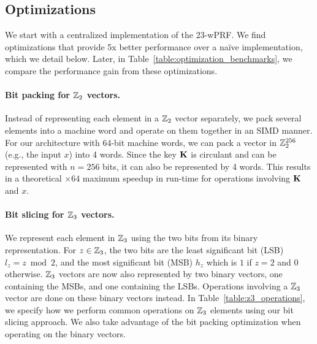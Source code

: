 \subsection{Optimizations}
\label{subsec:implementation_opt}
We start with a centralized implementation of the 23-wPRF. We find optimizations that provide 5x better performance over a na\"ive implementation, which we detail below. Later, in Table~\ref{table:optimization_benchmarks}, we compare the performance gain from these optimizations.

\paragraph{Bit packing for $\mathbb{Z}_2$ vectors.} 
Instead of representing each element in a $\mathbb{Z}_2$ vector separately, we pack several elements into a machine word and operate on them together in an SIMD manner. For our architecture with 64-bit machine words, we can pack a vector in $\mathbb{Z}_2^{256}$ (e.g., the input $x$) into 4 words. Since the key $\mat{K}$ is circulant and can be represented with $n=256$ bits, it can also be represented by 4 words. This results in a theoretical $\times64$ maximum speedup in run-time for operations involving $\mat{K}$ and $x$. 

\paragraph{Bit slicing for $\mathbb{Z}_3$ vectors.}
We represent each element in $\mathbb{Z}_3$ using the two bits from its binary representation. For $z \in \mathbb{Z}_3$, the two bits are the least significant bit (LSB) $l_z = z \bmod 2$, and the most significant bit (MSB) $h_z$ which is $1$ if $z=2$ and $0$ otherwise. $\mathbb{Z}_3$ vectors are now also represented by two binary vectors, one containing the MSBs, and one containing the LSBs. Operations involving a $\mathbb{Z}_3$ vector are done on these binary vectors instead. In Table~\ref{table:z3_operations}, we specify how we perform common operations on $\mathbb{Z}_3$ elements using our bit slicing approach. We also take advantage of the bit packing optimization when operating on the binary vectors.


